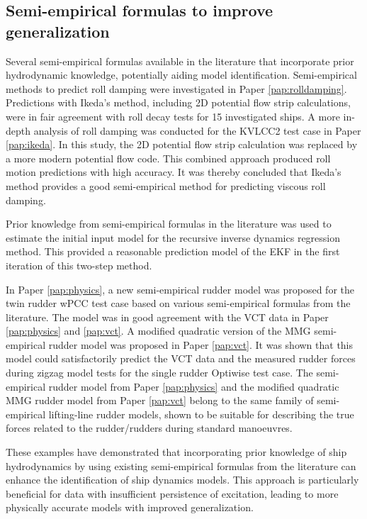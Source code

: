 \subsection*{Semi-empirical formulas to improve generalization}
Several semi-empirical formulas available in the literature that incorporate prior hydrodynamic knowledge, potentially aiding model identification.       
Semi-empirical methods to predict roll damping were investigated in Paper \ref{pap:rolldamping}. Predictions with Ikeda's method, including 2D potential flow strip calculations, were in fair agreement with roll decay tests for 15 investigated ships. 
A more in-depth analysis of roll damping was conducted for the KVLCC2 test case in Paper \ref{pap:ikeda}. In this study, the 2D potential flow strip calculation was replaced by a more modern potential flow code. This combined approach produced roll motion predictions with high accuracy. It was thereby concluded that Ikeda's method provides a good semi-empirical method for predicting viscous roll damping.

Prior knowledge from semi-empirical formulas in the literature was used to estimate the initial input model for the recursive inverse dynamics regression method. This provided a reasonable prediction model of the EKF in the first iteration of this two-step method.

In Paper \ref{pap:physics}, a new semi-empirical rudder model was proposed for the twin rudder wPCC test case based on various semi-empirical formulas from the literature. The model was in good agreement with the VCT data in Paper \ref{pap:physics} and \ref{pap:vct}. 
A modified quadratic version of the MMG semi-empirical rudder model was proposed in Paper \ref{pap:vct}. 
It was shown that this model could satisfactorily predict the VCT data and the measured rudder forces during zigzag model tests for the single rudder Optiwise test case. 
The semi-empirical rudder model from Paper \ref{pap:physics} and the modified quadratic MMG rudder model from Paper \ref{pap:vct} belong to the same family of semi-empirical lifting-line rudder models, shown to be suitable for describing the true forces related to the rudder/rudders during standard manoeuvres. 

These examples have demonstrated that incorporating prior knowledge of ship hydrodynamics by using existing semi-empirical formulas from the literature can enhance the identification of ship dynamics models. This approach is particularly beneficial for data with insufficient persistence of excitation, leading to more physically accurate models with improved generalization. 

